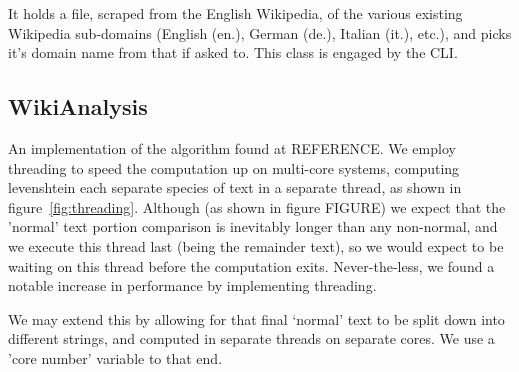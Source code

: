 It holds a file, scraped from the English Wikipedia, of the various
existing Wikipedia sub-domains (English (en.), German (de.), Italian
(it.), etc.), and picks it's domain name from that if asked to. This
class is engaged by the CLI.

\subsection*{WikiAnalysis}
An implementation of the algorithm found at REFERENCE. We employ
threading to speed the computation up on multi-core systems, computing
levenshtein each separate species of text in a separate thread, as
shown in figure~\ref{fig:threading}. Although (as shown in figure
FIGURE) we expect that the 'normal' text portion comparison is
inevitably longer than any non-normal, and we execute this thread last
(being the remainder text), so we would expect to be waiting on this
thread before the computation exits. Never-the-less, we found a
notable increase in performance by implementing threading.

We may extend this by allowing for that final `normal' text to be
split down into different strings, and computed in separate threads on
separate cores. We use a 'core number' variable to that end.




    




